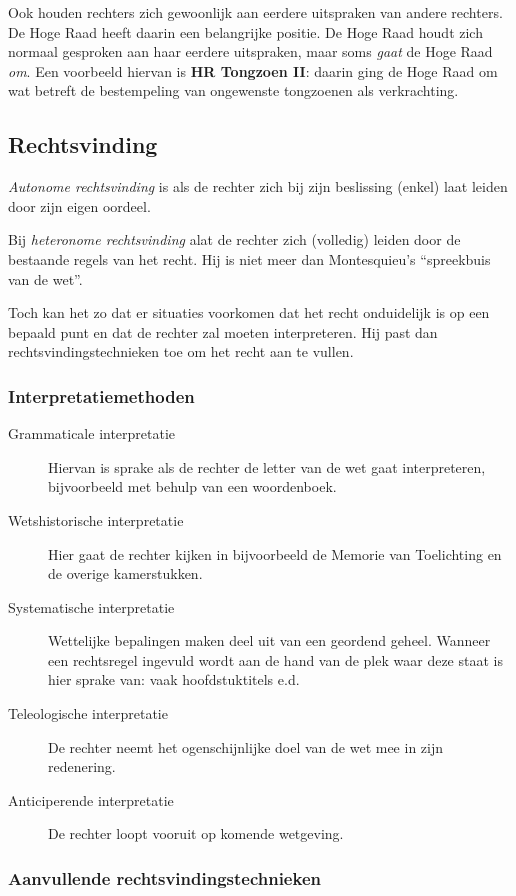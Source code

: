 \documentclass{article}
\begin{document}
Ook houden rechters zich gewoonlijk aan eerdere uitspraken van andere rechters.
De Hoge Raad heeft daarin een belangrijke positie. De Hoge Raad houdt zich
normaal gesproken aan haar eerdere uitspraken, maar soms \emph{gaat} de Hoge
Raad \emph{om}. Een voorbeeld hiervan is \textbf{HR Tongzoen II}: daarin ging
de Hoge Raad om wat betreft de bestempeling van ongewenste tongzoenen als 
verkrachting.

\subsection{Rechtsvinding}

\emph{Autonome rechtsvinding} is als de rechter zich bij zijn beslissing
(enkel) laat leiden door zijn eigen oordeel. 

Bij \emph{heteronome rechtsvinding} alat de rechter zich (volledig) leiden
door de bestaande regels van het recht. Hij is niet meer dan Montesquieu's 
``spreekbuis van de wet''. 

Toch kan het zo dat er situaties voorkomen dat het recht onduidelijk is
op een bepaald punt en dat de rechter zal moeten interpreteren. Hij past
dan rechtsvindingstechnieken toe om het recht aan te vullen. 

\subsubsection{Interpretatiemethoden}
\begin{description}
  \item[Grammaticale interpretatie] Hiervan is sprake als de rechter de letter
    van de wet gaat interpreteren, bijvoorbeeld met behulp van een woordenboek. 
  \item[Wetshistorische interpretatie] Hier gaat de rechter kijken in bijvoorbeeld
    de Memorie van Toelichting en de overige kamerstukken. 
  \item[Systematische interpretatie] Wettelijke bepalingen maken deel uit van een
    geordend geheel. Wanneer een rechtsregel ingevuld wordt aan de hand van 
    de plek waar deze staat is hier sprake van: vaak hoofdstuktitels e.d.
  \item[Teleologische interpretatie] De rechter neemt het ogenschijnlijke doel
    van de wet mee in zijn redenering. 
  \item[Anticiperende interpretatie] De rechter loopt vooruit op komende 
    wetgeving. 
\end{description}

\subsubsection{Aanvullende rechtsvindingstechnieken}
\end{document}
